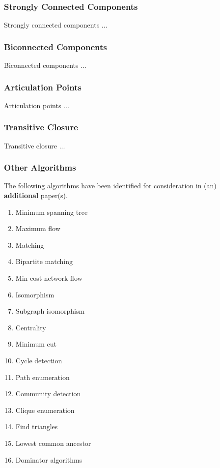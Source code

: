 \documentclass[10pt,onecolumn]{article}
\begin{document}
\subsubsection{Strongly Connected Components}
Strongly connected components \cite{REF_} ...

\subsubsection{Biconnected Components}
Biconnected components \cite{REF_} ...

\subsubsection{Articulation Points}
Articulation points \cite{REF_} ...

\subsubsection{Transitive Closure}
Transitive closure \cite{REF_} ...

\subsubsection{Other Algorithms}
The following algorithms have been identified for consideration in (an) \textbf{additional} paper(s).

\begin{enumerate}
\item Minimum spanning tree
\item Maximum flow
\item Matching
\item Bipartite matching
\item Min-cost network flow
\item Isomorphism
\item Subgraph isomorphism
\item Centrality
\item Minimum cut
\item Cycle detection
\item Path enumeration
\item Community detection
\item Clique enumeration
\item Find triangles
\item Lowest common ancestor
\item Dominator algorithms
\end{enumerate}
\end{document}
